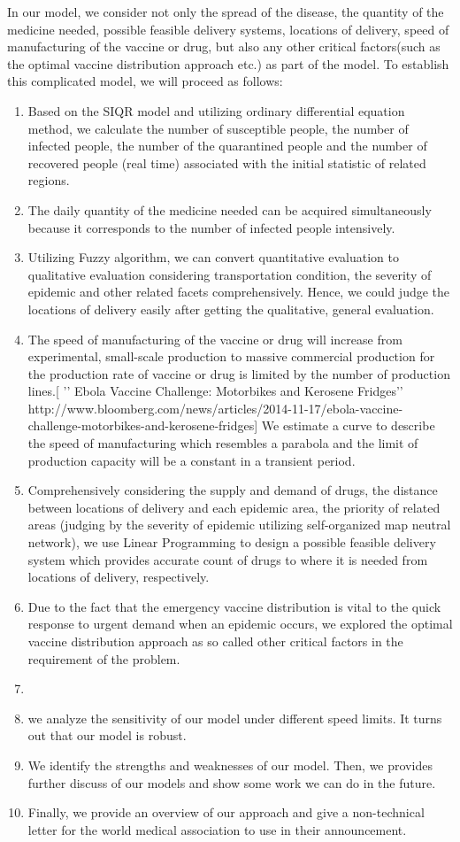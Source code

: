 In our model, we consider not only the spread of the disease, the quantity of the medicine needed, possible feasible delivery systems, locations of delivery, speed of manufacturing of the vaccine or drug, but also any other critical factors(such as the optimal vaccine distribution approach etc.) as part of the model.
To establish this complicated model, we will proceed as follows:
\begin{enumerate}
\item Based on the SIQR model and utilizing ordinary differential equation method, we calculate the number of susceptible people, the number of infected people, the number of the quarantined people and the number of recovered people (real time) associated with the initial statistic of related regions.
\item The daily quantity of the medicine needed can be acquired simultaneously because it corresponds to the number of infected people intensively.
\item	Utilizing Fuzzy algorithm, we can convert quantitative evaluation to qualitative evaluation considering transportation condition, the severity of epidemic and other related facets comprehensively. Hence, we could judge the locations of delivery easily after getting the qualitative, general evaluation.
\item	The speed of manufacturing of the vaccine or drug will increase from experimental, small-scale production to massive commercial production for the production rate of vaccine or drug is limited by the number of production lines.[ ’’ Ebola Vaccine Challenge: Motorbikes and Kerosene Fridges’’ http://www.bloomberg.com/news/articles/2014-11-17/ebola-vaccine-challenge-motorbikes-and-kerosene-fridges] We estimate a curve to describe the speed of manufacturing which resembles a parabola and the limit of production capacity will be a constant in a transient period.
\item	Comprehensively considering the supply and demand of drugs, the distance between locations of delivery and each epidemic area, the priority of related areas (judging by the severity of epidemic utilizing self-organized map neutral network), we use Linear Programming to design a possible feasible delivery system which provides accurate count of drugs to where it is needed from locations of delivery, respectively.
\item	Due to the fact that the emergency vaccine distribution is vital to the quick response to urgent demand when an epidemic occurs, we explored the optimal vaccine distribution approach as so called other critical factors in the requirement of the problem.
\item	%
\item	%
we analyze the sensitivity of our model under different speed limits. It turns out that our model is robust.
\item	We identify the strengths and weaknesses of our model. Then, we provides further discuss of our models and show some work we can do in the future.
\item	Finally, we provide an overview of our approach and give a non-technical letter for the world medical association to use in their announcement.
\end{enumerate}
